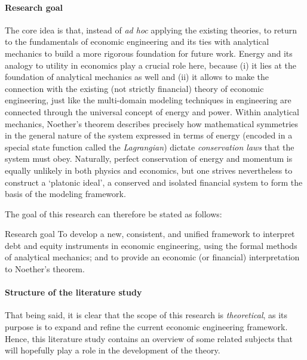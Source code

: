 \paragraph{Research goal} The core idea is that, instead of \emph{ad hoc} applying the existing theories, to return to the fundamentals of economic engineering and its ties with analytical mechanics to build a more rigorous foundation for future work. Energy and its analogy to utility in economics play a crucial role here, because (i) it lies at the foundation of analytical mechanics as well and (ii) it allows to make the connection with the existing (not strictly financial) theory of economic engineering, just like the multi-domain modeling techniques in engineering are connected through the universal concept of energy and power. Within analytical mechanics, Noether's theorem describes precisely how mathematical symmetries in the general nature of the system expressed in terms of energy (encoded in a special state function called the \emph{Lagrangian}) dictate \emph{conservation laws} that the system must obey. Naturally, perfect conservation of energy and momentum is equally unlikely in both physics and economics, but one strives nevertheless to construct a `platonic ideal', a conserved and isolated financial system to form the basis of the modeling framework.

The goal of this research can therefore be stated as follows: 
\begin{block}{Research goal}
    To develop a new, consistent, and unified framework to interpret debt and equity instruments in economic engineering, using the formal methods of analytical mechanics; and to provide an economic (or financial) interpretation to Noether's theorem.
\end{block}
\paragraph{Structure of the literature study} That being said, it is clear that the scope of this research is \emph{theoretical}, as its purpose is to expand and refine the current economic engineering framework. Hence, this literature study contains an overview of some related subjects that will hopefully play a role in the development of the theory. 




